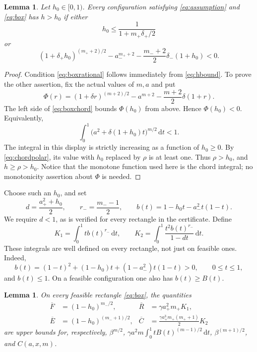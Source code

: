 \documentclass[11pt,letterpaper,reqno]{amsart}
\newtheorem{lem}[thm]{Lemma}
\theoremstyle{definition}
\numberwithin{equation}{section}
\newcommand{\dd}{\,\mathrm d}
\begin{document}
\begin{lem}\label{lem:boxpolar}
Let $h_0\in[0,1)$. Every configuration satisfying \eqref{eq:assumption} and \eqref{eq:box} has $h>h_0$ if either
\begin{equation}\label{eq:boxrational}
 h_0\le\frac1{1+m_+\delta_+/2}
\end{equation}
or
\begin{equation}\label{eq:boxchord}
 (1+\delta_+h_0)^{(m_++2)/2}
 -a_-^{m_++2}-\frac{m_-+2}{2}\delta_-(1+h_0)<0.
\end{equation}
\end{lem}

\begin{proof}
Condition \eqref{eq:boxrational} follows immediately from \eqref{eq:hbound}. To prove the other assertion, fix the actual values of $m,a$ and put
\[
 \Phi(r)=(1+\delta r)^{(m+2)/2}
       -a^{m+2}-\frac{m+2}{2}\delta(1+r).
\]
The left side of \eqref{eq:boxchord} bounds $\Phi(h_0)$ from above. Hence $\Phi(h_0)<0$. Equivalently,
\[
 \int_0^1\bigl(a^2+\delta(1+h_0)t\bigr)^{m/2}\dd t<1.
\]
The integral in this display is strictly increasing as a function of $h_0\ge0$. By \eqref{eq:chordpolar}, its value with $h_0$ replaced by $\rho$ is at least one. Thus $\rho>h_0$, and $h\ge\rho>h_0$. Notice that the monotone function used here is the chord integral; no monotonicity assertion about $\Phi$ is needed.
\end{proof}

Choose such an $h_0$, and set
\[
 d=\frac{a_+^2+h_0}{2},\qquad r_- =\frac{m_--1}{2},\qquad
 b(t)=1-h_0t-a_-^2t(1-t).
\]
We require $d<1$, as is verified for every rectangle in the certificate. Define
\begin{equation}\label{eq:Kdef}
 K_1=\int_0^1t b(t)^{r_-}\dd t,\qquad
 K_2=\int_0^1\frac{t^2b(t)^{r_-}}{1-dt}\dd t.
\end{equation}
These integrals are well defined on every rectangle, not just on feasible ones. Indeed,
\[
 b(t)=(1-t)^2+(1-h_0)t+(1-a_-^2)t(1-t)>0,
 \qquad 0\le t\le1,
\]
and $b(t)\le1$. On a feasible configuration one also has $b(t)\ge B(t)$.

\begin{lem}\label{lem:boxbounds}
On every feasible rectangle \eqref{eq:box}, the quantities
\[
 \begin{aligned}
 \overline F&=(1-h_0)^{m_-/2},&
 \overline R&=\gamma a_+^2m_+K_1,\\
 \overline E&=(1-h_0)^{(m_-+1)/2},&
 \overline C&=\frac{\gamma a_+^3m_+(m_++1)}2K_2
 \end{aligned}
\]
are upper bounds for, respectively, $\beta^{m/2}$,
$\gamma a^2m\int_0^1tB(t)^{(m-1)/2}\dd t$,
$\beta^{(m+1)/2}$, and $C(a,x,m)$.
\end{lem}
\end{document}
